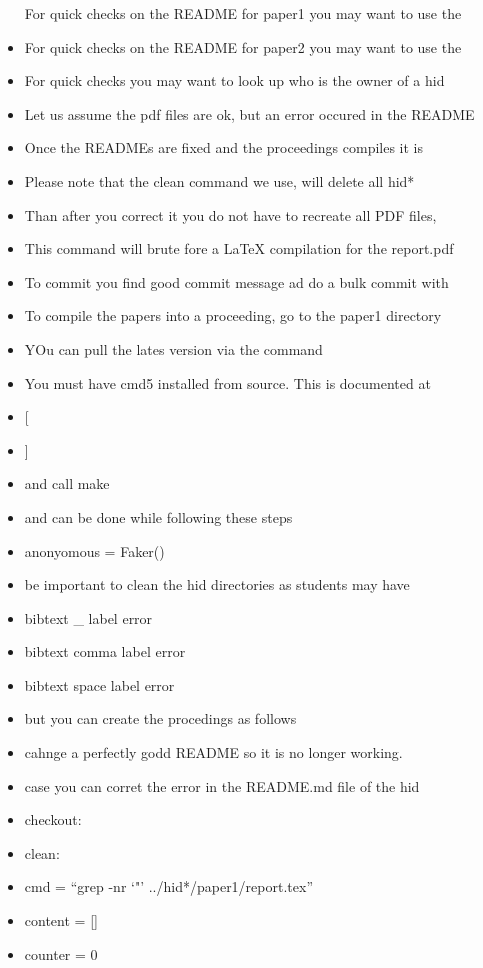 \begin{itemize}
  For quick checks on the README for paper1 you may want to use the
\item
  For quick checks on the README for paper2 you may want to use the
\item
  For quick checks you may want to look up who is the owner of a hid
\item
  Let us assume the pdf files are ok, but an error occured in the README
\item
  Once the READMEs are fixed and the proceedings compiles it is
\item
  Please note that the clean command we use, will delete all hid*
\item
  Than after you correct it you do not have to recreate all PDF files,
\item
  This command will brute fore a LaTeX compilation for the report.pdf
\item
  To commit you find good commit message ad do a bulk commit with
\item
  To compile the papers into a proceeding, go to the paper1 directory
\item
  YOu can pull the lates version via the command
\item
  You must have cmd5 installed from source. This is documented at
\item
  {[}
\item
  {]}
\item
  and call make
\item
  and can be done while following these steps
\item
  anonyomous = Faker()
\item
  be important to clean the hid directories as students may have
\item
  bibtext \_ label error
\item
  bibtext comma label error
\item
  bibtext space label error
\item
  but you can create the procedings as follows
\item
  cahnge a perfectly godd README so it is no longer working.
\item
  case you can corret the error in the README.md file of the hid
\item
  checkout:
\item
  clean:
\item
  cmd = ``grep -nr `"' ../hid*/paper1/report.tex''
\item
  content = {[}{]}
\item
  counter = 0

\end{itemize}
